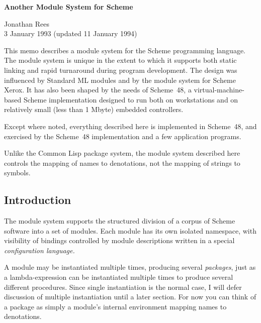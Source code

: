 



\newcommand{\goesto}{\hbox{$\longrightarrow$}}
\newcommand{\alt}{$\vert$}
\newcommand{\arbno}[1]{{{#1}$^*$}}
\newcommand{\hack}{Scheme~48}



\begin{center}
{\Large\bf Another Module System for Scheme}

\vspace{2ex}
Jonathan Rees \\
3 January 1993 (updated 11 January 1994)
\end{center}

\vspace{3ex}

This memo describes a module system for the Scheme programming
language.  The module system is unique in the extent to which it
supports both static linking and rapid turnaround during program
development.  The design was influenced by Standard ML
modules\cite{MacQueen:Modules} and by the module system for Scheme
Xerox\cite{Curtis-Rauen:Modules}.  It has also been shaped by the
needs of \hack{}, a virtual-machine-based Scheme implementation
designed to run both on workstations and on relatively small (less
than 1 Mbyte) embedded controllers.

Except where noted, everything described here is implemented in
\hack{}, and exercised by the \hack{} implementation and a few
application programs.

Unlike the Common Lisp package system, the module system described
here controls the mapping of names to denotations, not the
mapping of strings to symbols.


\subsection*{Introduction}

The module system supports the structured division of a corpus of
Scheme software into a set of modules.  Each module has its own
isolated namespace, with visibility of bindings controlled by module
descriptions written in a special {\em configuration language.}

A module may be instantiated multiple times, producing several {\em
packages}, just as a lambda-expression can be instantiated multiple
times to produce several different procedures.  Since single
instantiation is the normal case, I will defer discussion of multiple
instantiation until a later section.  For now you can think of a
package as simply a module's internal environment mapping names to
denotations.

